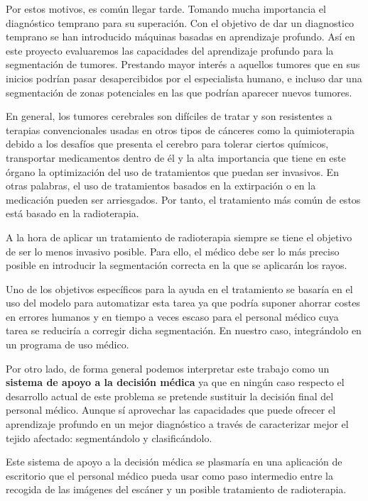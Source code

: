 Por estos motivos, es común llegar tarde. Tomando mucha importancia el diagnóstico temprano para su superación. Con el objetivo de dar un diagnostico temprano se han introducido máquinas basadas en aprendizaje profundo. Así en este proyecto evaluaremos las capacidades del aprendizaje profundo para la segmentación de tumores. Prestando mayor interés a aquellos tumores que en sus inicios podrían pasar desapercibidos por el especialista humano, e incluso dar una segmentación de zonas potenciales en las que podrían aparecer nuevos tumores.

En general, los tumores cerebrales son difíciles de tratar y son resistentes a terapias convencionales usadas en otros tipos de cánceres como la quimioterapia debido a los desafíos que presenta el cerebro para tolerar ciertos químicos, transportar medicamentos dentro de él y la alta importancia que tiene en este órgano la optimización del uso de tratamientos que puedan ser invasivos. En otras palabras, el uso de tratamientos basados en la extirpación o en la medicación pueden ser arriesgados. Por tanto, el tratamiento más común de estos está basado en la radioterapia.

A la hora de aplicar un tratamiento de radioterapia siempre se tiene el objetivo de ser lo menos invasivo posible. Para ello, el médico debe ser lo más preciso posible en introducir la segmentación correcta en la que se aplicarán los rayos. 

Uno de los objetivos específicos para la ayuda en el tratamiento se basaría en el uso del modelo para automatizar esta tarea ya que podría suponer ahorrar costes en errores humanos y en tiempo a veces escaso para el personal médico cuya tarea se reduciría a corregir dicha segmentación. En nuestro caso, integrándolo en un programa de uso médico. 

Por otro lado, de forma general podemos interpretar este trabajo como un \textbf{sistema de apoyo a la decisión médica} ya que en ningún caso respecto el desarrollo actual de este problema se pretende sustituir la decisión final del personal médico. Aunque sí aprovechar las capacidades que puede ofrecer el aprendizaje profundo en un mejor diagnóstico a través de caracterizar mejor el tejido afectado: segmentándolo y clasificándolo.

Este sistema de apoyo a la decisión médica se plasmaría en una aplicación de escritorio que el personal médico pueda usar como paso intermedio entre la recogida de las imágenes del escáner y un posible tratamiento de radioterapia.



